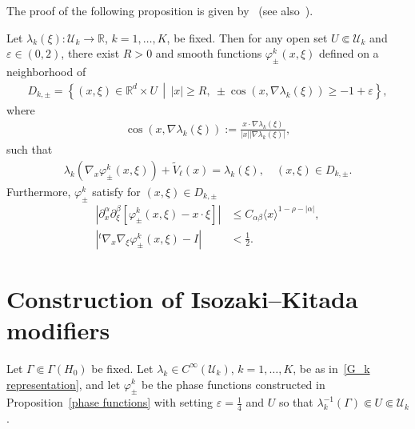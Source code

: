 \documentclass[AHL,Unicode,longabstracts,published]{cedram}
\newcommand{\e}{\varepsilon}
\newcommand{\f}{\varphi}
\renewcommand{\l}{\lambda}
\newcommand{\x}{\xi}
\newcommand{\R}{\mathbb{R}}
\newcommand{\US}{\mathcal{U}}
\newcommand{\R}{\mathbb{R}}
\begin{document}
The proof of the following proposition is given by~\cite[Section~2]{N3} (see also~\cite{IsoKita,T1}).

\begin{prop}\label{phase functions}
Let $\l_k(\x):\US_k\to\R$, $k=1,\dots,K$, be fixed. Then for any open set $U \Subset \US_k$ and $\e\in(0,2)$, there exist $R>0$ and smooth functions $\f_\pm^k(x,\x)$ defined on a neighborhood of
\begin{align*}
D_{k,\pm} = \left\{(x,\x)\in \R^d \times U \,\middle|\, |x| \geq R, \ \pm \cos(x,\nabla\lambda_k(\x)) \geq-1+\e \right\},
\end{align*}
where
\begin{align*}
\cos(x,\nabla\l_k(\x)) := \frac{x\cdot\nabla\l_k(\x)}{|x| |\nabla\l_k(\x)|},
\end{align*}
such that
\begin{align}\label{eikonal}
\l_k\left(\nabla_x\f_\pm^k(x,\x)\right) + \tilde V_\ell(x) = \l_k(\x), \quad (x,\x) \in D_{k,\pm}.
\end{align}
Furthermore, $\f_\pm^k$ satisfy for $(x,\xi)\in D_{k,\pm}$
\begin{align}
\left|\partial_x^\alpha\partial_\xi^\beta\left[\varphi_\pm^k(x,\xi)-x\cdot\xi\right]\right| &\leq C_{\alpha\beta} \langle x\rangle^{1-\rho-|\alpha|}, \label{phase estimate}
\\
\left|{}^t\nabla_x\nabla_\xi\varphi_\pm^k(x,\xi)-I \right|&<\frac{1}{2}. \label{phase estimate2}
\end{align}
\end{prop}


\section{Construction of Isozaki--Kitada modifiers}\label{IK section}

Let $\Gamma\Subset\Gamma(H_0)$ be fixed. Let $\l_k \in C^\infty(\US_k)$, $k=1,\dots,K$, be as in~\eqref{G_k representation}, and let $\f_{\pm}^{k}$ be the phase functions constructed in Proposition~\ref{phase functions} with setting $\e=\frac14$ and $U$ so that $\l_k^{-1}(\Gamma)\Subset U \Subset \US_k$.
\end{document}
